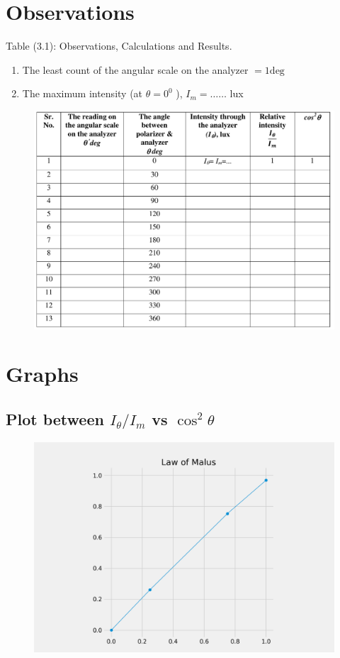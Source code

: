 \documentclass[11pt]{article}
\begin{document}
	\section{Observations}

Table (3.1): Observations, Calculations and Results.
\begin{enumerate}
	\item The least count of the angular scale on the analyzer $=1 \mathrm{deg}$
	\item The maximum intensity (at $\theta=0^{0}$ ), $I_{m}=\ldots \ldots$ lux
\end{enumerate}


\begin{figure}[H]
	\centering
	\includegraphics[scale=0.5]{table.png}
	\label{it}
\end{figure}

\section{Graphs}
\subsection{Plot between $I_\theta /I_m$ vs $\cos^2\theta$}
\begin{figure}[H]
	\centering
	\includegraphics[scale=0.6]{plot2.png}
	\label{it}
\end{figure}
\end{document}

